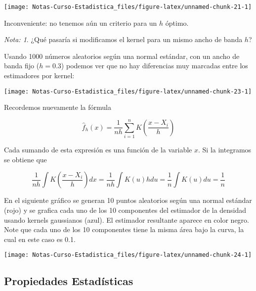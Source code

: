 \documentclass[
  12pt,
]{book}
\theoremstyle{definition}
\theoremstyle{definition}
\theoremstyle{definition}
\theoremstyle{definition}
\theoremstyle{remark}
\newtheorem*{remark}{Nota: }
\begin{document}
\begin{center}\texttt{[image: Notas-Curso-Estadistica\_files/figure-latex/unnamed-chunk-21-1]} \end{center}

Inconveniente: no tenemos aún un criterio para un \(h\) óptimo.

\begin{remark}
¿Qué pasaría si modificamos el kernel para un mismo ancho de banda \(h\)?
\end{remark}

Usando 1000 números aleatorios según una normal estándar, con un ancho de banda fijo (\(h=0.3\)) podemos ver que no hay diferencias muy marcadas entre los estimadores por kernel:

\begin{center}\texttt{[image: Notas-Curso-Estadistica\_files/figure-latex/unnamed-chunk-23-1]} \end{center}

Recordemos nuevamente la fórmula

\begin{equation*}
\hat{f}_{h}\left( x \right) = \frac{1}{nh}\sum_{i=1}^{n} K\left( \frac{x-X_{i}}{h} \right)
\end{equation*}

Cada sumando de esta expresión es una función de la variable \(x\). Si la integramos se obtiene que

\begin{equation*}
\frac{1}{nh}\int K\left( \frac{x-X_{i}}{h} \right) dx
= \frac{1}{nh} \int K\left( u \right) h du
= \frac{1}{n} \int K(u) du
= \frac{1}{n}
\end{equation*}

En el siguiente gráfico se generan 10 puntos aleatorios según una normal estándar (rojo) y se grafica cada uno de los 10 componentes del estimador de la densidad usando kernels gaussianos (azul). El estimador resultante aparece en color negro. Note que cada uno de los 10 componentes tiene la misma área bajo la curva, la cual en este caso es 0.1.

\begin{center}\texttt{[image: Notas-Curso-Estadistica\_files/figure-latex/unnamed-chunk-24-1]} \end{center}

\hypertarget{propiedades-estaduxedsticas-2}{%
\subsection{Propiedades Estadísticas}\label{propiedades-estaduxedsticas-2}}
\end{document}
